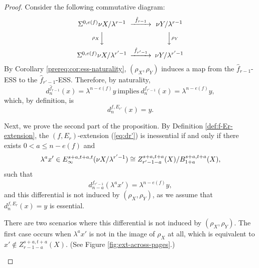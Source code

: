 \begin{proof}
    Consider the following commutative diagram:
    $$\begin{CD}
        \Sus^{0,e(f)}\nu X/\lambda^{r-1} @>{\hat f_{r-1}}>> \nu Y/\lambda^{r-1} \\
        @V{\rho_X}VV @VV{\rho_Y}V \\
        \Sus^{0,e(f)}\nu X/\lambda^{r'-1} @>{\hat f_{r'-1}}>> \nu Y/\lambda^{r'-1}
    \end{CD}$$
    By Corollary \ref{prereq:cor:ess-naturality}, $(\rho_X,\rho_Y)$ induces a map from the $\hat f_{r-1}$-ESS to the $\hat f_{r'-1}$-ESS. Therefore, by naturality,
    $$d^{\hat f_{r-1}}_n(x)=\lambda^{n-e(f)} y\ \text{implies} \ d^{\hat f_{r'-1}}_n(x)=\lambda^{n-e(f)} y,$$
    which, by definition, is
    $$d^{f,E_{r'}}_n(x)=y.$$
   
    Next, we prove the second part of the proposition. By Definition \ref{def:f-Er-extension}, the $(f,E_r)$-extension (\ref{eq:dr'}) is inessential if and only if 
    there exists $0<a\le n-e(f)$ and 
    $$\lambda^a x'\in E_\infty^{s+a,t+a,t}(\nu X/\lambda^{r'-1})\cong Z_{r'-1-a}^{s+a,t+a}(X)/B_{1+a}^{s+a,t+a}(X),$$
    such that
    \begin{equation}\label{eq:inessential-crossing}
        d^{\hat f_{r'-1}}_{n-a}(\lambda^ax')=\lambda^{n-e(f)} y,
    \end{equation}
    and this differential is not induced by $(\rho_X,\rho_Y)$, as we assume that $d^{f,E_r}_n(x)=y$ is essential.
    
    There are two scenarios where this differential is not induced by $(\rho_X,\rho_Y)$. The first case occurs when $\lambda^ax'$ is not in the image of $\rho_X$ at all, which is equivalent to $x'\notin Z_{r-1-a}^{s+a,t+a}(X)$. (See Figure \ref{fig:ext-across-pages}.) 
    
    \begin{figure}[h]
    \centering
\end{figure}
\end{proof}
